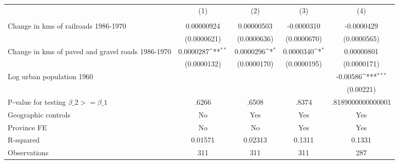 {
\def\sym#1{\ifmmode^{#1}\else\(^{#1}\)\fi}
\begin{tabular}{l*{4}{c}}
\hline\hline
                &\multicolumn{1}{c}{(1)}&\multicolumn{1}{c}{(2)}&\multicolumn{1}{c}{(3)}&\multicolumn{1}{c}{(4)}\\
                &\multicolumn{1}{c}{}&\multicolumn{1}{c}{}&\multicolumn{1}{c}{}&\multicolumn{1}{c}{}\\
\hline
Change in kms of railroads 1986-1970&0.00000924         &0.00000503         &-0.0000310         &-0.0000429         \\
                &(0.0000621)         &(0.0000636)         &(0.0000670)         &(0.0000565)         \\
[1em]
Change in kms of paved and gravel roads 1986-1970&0.0000287\sym{**} &0.0000296\sym{*}  &0.0000340\sym{*}  &0.00000801         \\
                &(0.0000132)         &(0.0000170)         &(0.0000195)         &(0.0000171)         \\
[1em]
Log urban population 1960&                  &                  &                  & -0.00586\sym{***}\\
                &                  &                  &                  &(0.00221)         \\
\hline
P-value for testing $\beta\_{2} >= \beta\_{1}$&    .6266         &    .6508         &    .8374         &.8189000000000001         \\
Geographic controls&       No         &      Yes         &      Yes         &      Yes         \\
Province FE     &       No         &       No         &      Yes         &      Yes         \\
R-squared       &  0.01571         &  0.02313         &   0.1311         &   0.1331         \\
Observations    &      311         &      311         &      311         &      287         \\
\hline\hline
\end{tabular}
}
